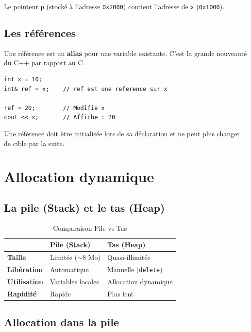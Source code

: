 \documentclass[12pt,a4paper]{article}
\begin{document}
Le pointeur \texttt{p} (stocké à l'adresse \texttt{0x2000}) contient l'adresse de \texttt{x} (\texttt{0x1000}).

\subsection{Les références}

Une référence est un \textbf{alias} pour une variable existante. C'est la grande nouveauté du C++ par rapport au C.

\begin{lstlisting}[style=cpp, caption={Utilisation des références}]
int x = 10;
int& ref = x;    // ref est une reference sur x

ref = 20;        // Modifie x
cout << x;       // Affiche : 20
\end{lstlisting}

\begin{astuce}
Une référence doit être initialisée lors de sa déclaration et ne peut plus changer de cible par la suite.
\end{astuce}

\section{Allocation dynamique}

\subsection{La pile (Stack) et le tas (Heap)}

\begin{table}[h!]
\centering
\caption{Comparaison Pile vs Tas}
\begin{tabular}{lll}
\toprule
 & \textbf{Pile (Stack)} & \textbf{Tas (Heap)} \\
\midrule
\textbf{Taille} & Limitée ($\sim$8 Mo) & Quasi-illimitée \\
\textbf{Libération} & Automatique & Manuelle (\texttt{delete}) \\
\textbf{Utilisation} & Variables locales & Allocation dynamique \\
\textbf{Rapidité} & Rapide & Plus lent \\
\bottomrule
\end{tabular}
\end{table}

\subsection{Allocation dans la pile}
\end{document}
